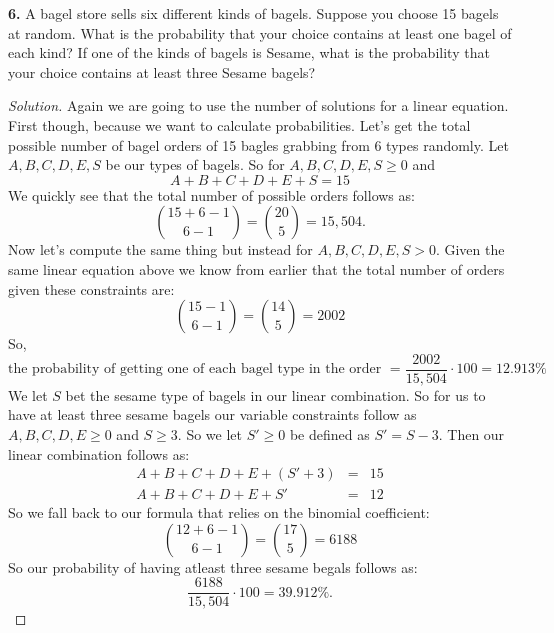 \documentclass[12pt]{amsart}
\newenvironment{solution}
{\begin{proof}[Solution]}
{\end{proof}}
\begin{document}
\begin{onehalfspace}
        \textbf{6.} A bagel store sells six different kinds of bagels. Suppose you choose 15
        bagels at random. What is the probability that your choice contains at least one bagel
        of each kind? If one of the kinds of bagels is Sesame, what is the probability that
        your choice contains at least three Sesame bagels?
        \begin{solution}
            Again we are going to use the number of solutions for a linear equation. First though, because we want to
            calculate probabilities. Let's get the total possible number of bagel orders of 15 bagles grabbing from 6 types
            randomly. Let ${A, B, C, D, E, S}$ be our types of bagels. So for $A, B, C, D, E, S \ge 0$ and
            \begin{displaymath}
                A + B + C + D + E + S = 15
            \end{displaymath}
            We quickly see that the total number of possible orders follows as:
            \begin{displaymath}
                \binom{15 + 6 - 1}{6 - 1} = \binom{20}{5} = 15,504.
            \end{displaymath}
            Now let's compute the same thing but instead for $A, B, C, D, E, S > 0$. Given the same linear equation
            above we know from earlier that the total number of orders given these constraints are:
            \begin{displaymath}
                \binom{15 - 1}{6 - 1} = \binom{14}{5} = 2002
            \end{displaymath}
            So,
            \begin{displaymath}
                \text{the probability of getting one of each bagel type in the order } = \frac{2002}{15,504}\cdot 100 = 12.913\%
            \end{displaymath}
            We let $S$ bet the sesame type of bagels in our linear combination. So for us to have at least three sesame
            bagels our variable constraints follow as $A, B, C, D, E \ge 0$ and $S \ge 3$. So we let $S' \ge 0$ be
            defined as $S' = S - 3$. Then our linear combination follows as:
            \begin{eqnarray*}
                A + B + C + D + E + (S' + 3) & = & 15 \\
                A + B + C + D + E + S' & = & 12
            \end{eqnarray*}
            So we fall back to our formula that relies on the binomial coefficient:
            \begin{displaymath}
                \binom{12 + 6 - 1}{6 - 1} = \binom{17}{5} = 6188
            \end{displaymath}
            So our probability of having atleast three sesame begals follows as:
            \begin{displaymath}
                \frac{6188}{15,504}\cdot 100 = 39.912\%.
            \end{displaymath}
        \end{solution}


\end{onehalfspace}
\end{document}
